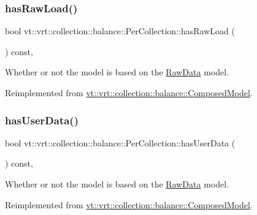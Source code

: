 \subsubsection{\texorpdfstring{has\+Raw\+Load()}{hasRawLoad()}}
{\footnotesize\ttfamily bool vt\+::vrt\+::collection\+::balance\+::\+Per\+Collection\+::has\+Raw\+Load (\begin{DoxyParamCaption}{ }\end{DoxyParamCaption}) const\hspace{0.3cm}{\ttfamily [override]}, {\ttfamily [virtual]}}



Whether or not the model is based on the \hyperlink{structvt_1_1vrt_1_1collection_1_1balance_1_1_raw_data}{Raw\+Data} model. 



Reimplemented from \hyperlink{classvt_1_1vrt_1_1collection_1_1balance_1_1_composed_model_ad6e2a1c572a80e35acad0fcf1a0e8071}{vt\+::vrt\+::collection\+::balance\+::\+Composed\+Model}.

\mbox{\label{structvt_1_1vrt_1_1collection_1_1balance_1_1_per_collection_a9b40a4b1370e174fc18df75c5256dbd2}} 
\subsubsection{\texorpdfstring{has\+User\+Data()}{hasUserData()}}
{\footnotesize\ttfamily bool vt\+::vrt\+::collection\+::balance\+::\+Per\+Collection\+::has\+User\+Data (\begin{DoxyParamCaption}{ }\end{DoxyParamCaption}) const\hspace{0.3cm}{\ttfamily [override]}, {\ttfamily [virtual]}}



Whether or not the model is based on the \hyperlink{structvt_1_1vrt_1_1collection_1_1balance_1_1_raw_data}{Raw\+Data} model. 



Reimplemented from \hyperlink{classvt_1_1vrt_1_1collection_1_1balance_1_1_composed_model_aec716d7c9de7e8e8601e0baae6c2b51e}{vt\+::vrt\+::collection\+::balance\+::\+Composed\+Model}.


